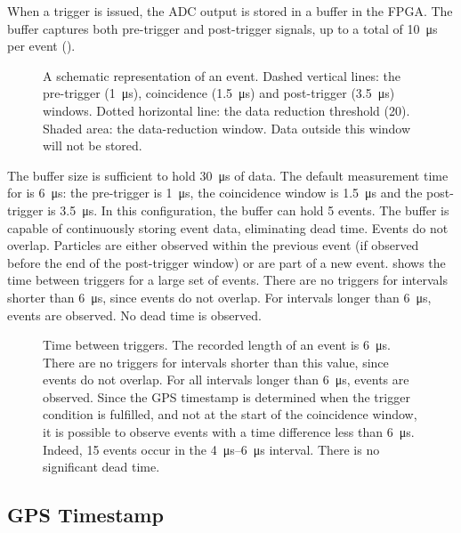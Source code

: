 When a trigger is issued, the ADC output is stored in a buffer in the FPGA. The
buffer captures both pre-trigger and post-trigger signals, up to a total of
\SI{10}{\micro\second} per event ().
\begin{figure}
\centering

\caption{ A schematic representation of an
event.  Dashed vertical lines: the pre-trigger (\SI{1}{\micro\second}),
coincidence (\SI{1.5}{\micro\second}) and post-trigger
(\SI{3.5}{\micro\second}) windows.  Dotted horizontal line: the data
reduction threshold (\SI{20}{\adc}).  Shaded area: the data-reduction
window. Data outside this window will not be stored.}
\label{fig:daq-time-windows}
\end{figure}
The buffer size is sufficient to hold
\SI{30}{\micro\second} of data. The default measurement time for \hisparc is
\SI{6}{\micro\second}: the pre-trigger is \SI{1}{\micro\second}, the coincidence
window is \SI{1.5}{\micro\second} and the post-trigger is
\SI{3.5}{\micro\second}. In this configuration, the buffer can hold 5 events.
The buffer is capable of continuously storing event data, eliminating dead time.
Events do not overlap. Particles are either observed within the previous event
(if observed before the end of the post-trigger window) or are part of a new
event.  shows the time between triggers for a large set of
events. There are no triggers for intervals shorter than \SI{6}{\micro\second},
since events do not overlap. For intervals longer than \SI{6}{\micro\second},
events are observed. No dead time is observed.

\begin{figure}
\centering
{


}
\caption{Time between triggers. The recorded length of an event is
\SI{6}{\micro\second}. There are no triggers for intervals shorter than this
value, since events do not overlap. For all intervals longer than
\SI{6}{\micro\second}, events are observed. Since the GPS timestamp is
determined when the trigger condition is fulfilled, and not at the start of
the coincidence window, it is possible to observe events with a time
difference less than \SI{6}{\micro\second}. Indeed, 15 events occur in the
\SIrange{4}{6}{\micro\second} interval. There is no significant dead time.}
\label{fig:dead-time}
\end{figure}


\subsection{GPS Timestamp}
\label{sec:gps-timing}

